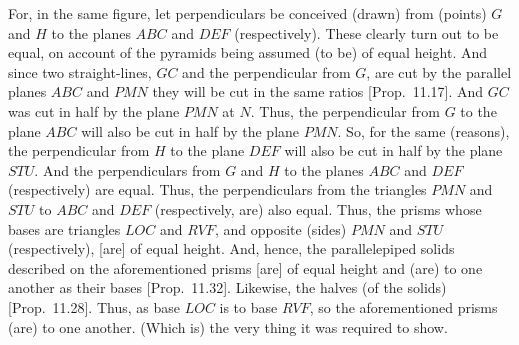 \begin{Parallel}{}{}
{For, in the same figure, let perpendiculars be conceived (drawn) from (points)
$G$ and $H$ to the planes $ABC$ and $DEF$ (respectively). These clearly turn
out to be equal, on account of the pyramids being assumed (to be) of equal height. And
since two straight-lines, $GC$ and the perpendicular from $G$, are cut by the parallel
planes $ABC$ and $PMN$ they will be cut in the same ratios [Prop.~11.17]. And $GC$ was cut in half by the plane $PMN$ at $N$. Thus, the perpendicular
from $G$ to the plane $ABC$ will also be cut in half by the plane $PMN$. So, for the same
(reasons), the perpendicular from $H$ to the plane $DEF$ will also be cut in half by the
plane $STU$. And  the perpendiculars from $G$ and $H$ to the planes $ABC$ and $DEF$
(respectively) are equal. Thus, the perpendiculars from the triangles $PMN$ and $STU$
to $ABC$ and $DEF$ (respectively, are) also equal. Thus, the prisms whose bases are triangles
$LOC$ and $RVF$, and opposite (sides) $PMN$ and $STU$ (respectively), [are] of equal height.
And, hence, the parallelepiped solids described on the aforementioned prisms
[are] of equal height and (are) to one another as their bases [Prop.~11.32]. Likewise, the halves (of
the solids) [Prop.~11.28].  Thus, as base $LOC$ is to base $RVF$, so the
aforementioned prisms (are) to one another. (Which is) the very thing it was required to show.}
\end{Parallel}

